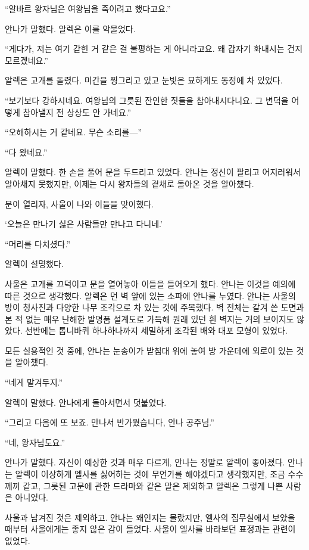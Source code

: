 ``알바르 왕자님은 여왕님을 죽이려고 했다고요.''

안나가 말했다. 알렉은 이를 악물었다.

``게다가, 저는 여기 갇힌 거 같은 걸 불평하는 게 아니라고요. 왜 갑자기 화내시는 건지 모르겠네요.''

알렉은 고개를 돌렸다. 미간을 찡그리고 있고 눈빛은 묘하게도 동정에 차 있었다.

``보기보다 강하시네요. 여왕님의 그릇된 잔인한 짓들을 참아내시다니요. 그 변덕을 어떻게 참아낼지 전 상상도 안 가네요.''

`` 오해하시는 거 같네요. 무슨 소리를—''

``다 왔네요.''

알렉이 말했다. 한 손을 풀어 문을 두드리고 있었다. 안나는 정신이 팔리고 어지러워서 알아채지 못했지만, 이제는 다시 왕자들의 곁채로 돌아온 것을 알아챘다.

문이 열리자, 사울이 나와 이들을 맞이했다.

`오늘은 만나기 싫은 사람들만 만나고 다니네.'

``머리를 다치셨다.''

알렉이 설명했다.

사울은 고개를 끄덕이고 문을 열어놓아 이들을 들어오게 했다. 안나는 이것을 예의에 따른 것으로 생각했다. 알렉은 먼 벽 앞에 있는 소파에 안나를 누였다. 안나는 사울의 방이 청사진과 다양한 나무 조각으로 차 있는 것에 주목했다. 벽 전체는 갈겨 쓴 도면과 본 적 없는 매우 난해한 발명품 설계도로 가득해 원래 있던 흰 벽지는 거의 보이지도 않았다. 선반에는 톱니바퀴 하나하나까지 세밀하게 조각된 배와 대포 모형이 있었다.

모든 실용적인 것 중에, 안나는 눈송이가 받침대 위에 놓여 방 가운데에 외로이 있는 것을 알아챘다.

``네게 맡겨두지.''

알렉이 말했다. 안나에게 돌아서면서 덧붙였다.

``그리고 다음에 또 보죠. 만나서 반가웠습니다, 안나 공주님.''

``네, 왕자님도요.''

안나가 말했다. 자신이 예상한 것과 매우 다르게, 안나는 정말로 알렉이 좋아졌다. 안나는 알렉이 이상하게 엘사를 싫어하는 것에 무언가를 해야겠다고 생각했지만, 조금 수수께끼 같고, 그릇된 고문에 관한 드라마와 같은 말은 제외하고 알렉은 그렇게 나쁜 사람은 아니었다.

사울과 남겨진 것은 제외하고. 안나는 왜인지는 몰랐지만, 엘사의 집무실에서 보았을 때부터 사울에게는 좋지 않은 감이 들었다. 사울이 엘사를 바라보던 표정과는 관련이 없었다.

